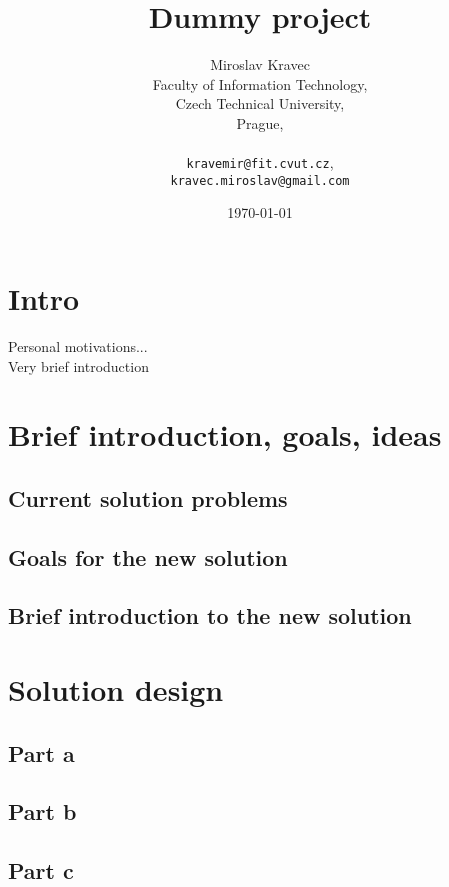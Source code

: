 \documentclass[11pt,a4paper]{book}
\title{Dummy project}
\author{Miroslav Kravec\\
  \small{Faculty of Information Technology,}\\
  \small{Czech Technical University,}\\
  \small{Prague,}\\
  \\
  \small{\texttt{kravemir@fit.cvut.cz}},\\
  \small{\texttt{kravec.miroslav@gmail.com}}
}
\date{\today}
\begin{document}
 

\pagestyle{plain}%

\maketitle

\tableofcontents

\chapter*{Intro}
 
Personal motivations...\\
Very brief introduction

\pagestyle{main}

\chapter{Brief introduction, goals, ideas}
\section{Current solution problems}
\section{Goals for the new solution}
\section{Brief introduction to the new solution}



\chapter{Solution design}
\section{Part a}
\blindtext
\blinditemize
\blindtext
\Blindtext
\section{Part b}
\blindtext
\blinditemize
\blindtext
\Blindtext
\section{Part c}
\blindtext
\blinditemize
\blindtext
\Blindtext
\end{document}
